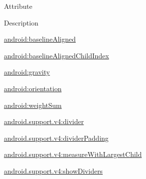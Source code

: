 Attribute

Description 

{\ttfamily \hyperlink{classandroid_1_1support_1_1v4_1_1R_1_1styleable_ad642c125826d2bed7ae25860cafd6edd}{android\+:baseline\+Aligned}}

{\ttfamily \hyperlink{classandroid_1_1support_1_1v4_1_1R_1_1styleable_a2c50eb551dc4f5ea5db0ac221a8ca0d7}{android\+:baseline\+Aligned\+Child\+Index}}

{\ttfamily \hyperlink{classandroid_1_1support_1_1v4_1_1R_1_1styleable_aa1757dce9a8d990b61214a54ba88e2fc}{android\+:gravity}}

{\ttfamily \hyperlink{classandroid_1_1support_1_1v4_1_1R_1_1styleable_a5b67b845c7e37a891973d4715fc0baeb}{android\+:orientation}}

{\ttfamily \hyperlink{classandroid_1_1support_1_1v4_1_1R_1_1styleable_a60122618908d765ecf7a6397f21a692a}{android\+:weight\+Sum}}

{\ttfamily \hyperlink{classandroid_1_1support_1_1v4_1_1R_1_1styleable_ad062fe8676838d9c14d62ca0905d04c7}{android.\+support.\+v4\+:divider}}

{\ttfamily \hyperlink{classandroid_1_1support_1_1v4_1_1R_1_1styleable_af6bd9621cf5c129d0028c9ac57569dc4}{android.\+support.\+v4\+:divider\+Padding}}

{\ttfamily \hyperlink{classandroid_1_1support_1_1v4_1_1R_1_1styleable_ae97a8388a99dc364d8df2d275288477c}{android.\+support.\+v4\+:measure\+With\+Largest\+Child}}

{\ttfamily \hyperlink{classandroid_1_1support_1_1v4_1_1R_1_1styleable_abca207974c64d98f9f476c69a829e50e}{android.\+support.\+v4\+:show\+Dividers}}

